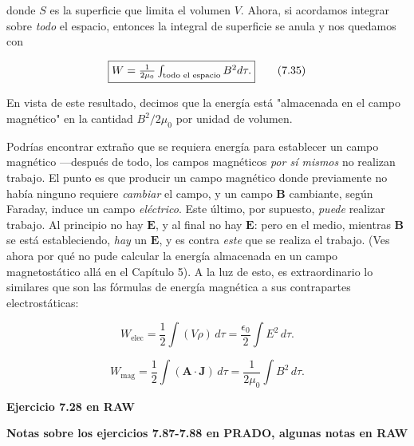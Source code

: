 \documentclass[12pt,a4paper]{report}
\newcommand{\esp}{\vspace{0.5cm}}
\begin{document}
	\esp
	
	donde $S$ es la superficie que limita el volumen $V$. Ahora, si acordamos integrar sobre \textit{todo} el espacio, entonces la integral de superficie se anula y nos quedamos con
	
	\esp
	
	\begin{equation}
		\fbox{$W = \frac{1}{2\mu_0} \int_{\text{todo el espacio}} B^2 d\tau.$} \tag{7.35}
	\end{equation}
	
	\esp
	
	En vista de este resultado, decimos que la energía está "almacenada en el campo magnético" en la cantidad $B^2 / 2\mu_0$ por unidad de volumen.
	
	\esp
	
	Podrías encontrar extraño que se requiera energía para establecer un campo magnético —después de todo, los campos magnéticos \textit{por sí mismos} no realizan trabajo. El punto es que producir un campo magnético donde previamente no había ninguno requiere \textit{cambiar} el campo, y un campo $\mathbf{B}$ cambiante, según Faraday, induce un campo \textit{eléctrico}. Este último, por supuesto, \textit{puede} realizar trabajo. Al principio no hay $\mathbf{E}$, y al final no hay $\mathbf{E}$: pero en el medio, mientras $\mathbf{B}$ se está estableciendo, \textit{hay} un $\mathbf{E}$, y es contra \textit{este} que se realiza el trabajo. (Ves ahora por qué no pude calcular la energía almacenada en un campo magnetostático allá en el Capítulo 5). A la luz de esto, es extraordinario lo similares que son las fórmulas de energía magnética a sus contrapartes electrostáticas:
	
	\esp
	
	\begin{equation}
		W_{\text{elec}} = \frac{1}{2} \int (V \rho) \, d\tau = \frac{\epsilon_0}{2} \int E^2 \, d\tau. \tag{2.43 y 2.45}
	\end{equation}
	
	\esp
	
	\begin{equation}
		W_{\text{mag}} = \frac{1}{2} \int (\mathbf{A} \cdot \mathbf{J}) \, d\tau = \frac{1}{2\mu_0} \int B^2 \, d\tau. \tag{7.32 y 7.35}
	\end{equation}
	
	\esp
	
	\noindent \textbf{Ejercicio 7.28 en RAW}
	
	\esp
	
	\noindent \textbf{Notas sobre los ejercicios 7.87-7.88 en PRADO, algunas notas en RAW}
	
\end{document}
